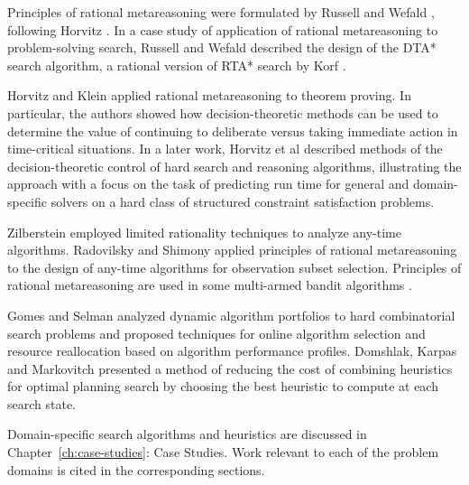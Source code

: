 Principles of rational metareasoning were formulated by Russell
and Wefald \cite{Russell.right}, following Horvitz
\cite{Horvitz.reasoningabout}. In a case study of application of rational
metareasoning to problem-solving search, Russell and Wefald
\cite{Russell.right} described the design of the DTA* search algorithm,
a rational version of RTA* search by Korf \cite{Korf.rta}. 

Horvitz and Klein \cite{Horvitz.proving} applied rational
metareasoning to theorem proving. In particular, the authors showed how
decision-theoretic methods can be used to determine the value of
continuing to deliberate versus taking immediate action in
time-critical situations. In a later work, Horvitz et al
\cite{Horvitz.bayesian} described methods of the
decision-theoretic control of hard search and
reasoning algorithms, illustrating the approach with a focus on the
task of predicting run time for general and domain-specific solvers on
a hard class of structured constraint satisfaction problems. 

Zilberstein \cite{Zilberstein.PHD} employed limited rationality
techniques to analyze any-time algorithms. Radovilsky and Shimony
\cite{Radovilsky.oss} applied principles of rational metareasoning to
the design of any-time algorithms for observation subset
selection. Principles of rational metareasoning are used in some
multi-armed bandit algorithms \cite{Vermorel.bandits}.

Gomes and Selman \cite{Gomes.portfolio} analyzed dynamic algorithm
portfolios to hard combinatorial search problems and proposed
techniques for online algorithm selection and resource reallocation
based on algorithm performance profiles. Domshlak, Karpas and
Markovitch \cite{Domshlak.maxornot} presented a method of reducing the
cost of combining heuristics for optimal planning search by choosing
the best heuristic to compute at each search state.

Domain-specific search algorithms and heuristics are discussed in 
Chapter~\ref{ch:case-studies}: Case Studies. Work relevant to each of
the problem domains is cited in the corresponding sections. 
